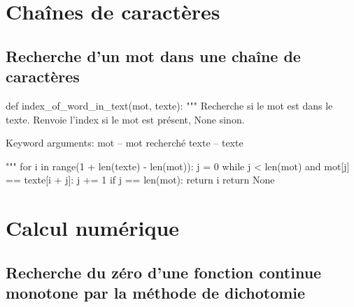\documentclass[10pt]{article}
\begin{document}
\section{Chaînes de caractères}
\subsection{Recherche d'un mot dans une chaîne de caractères}

\begin{minipage}[c]{.48\linewidth}
\begin{pseudo}
\end{pseudo}
\end{minipage} \hfill
\begin{minipage}[c]{.48\linewidth}
\begin{py}
\begin{python}
def index_of_word_in_text(mot, texte):
    """ Recherche si le mot est dans le texte.
    Renvoie l'index si le mot est présent, None sinon.
    
    Keyword arguments:
    mot -- mot recherché
    texte -- texte
    
    """
    for i in range(1 + len(texte) - len(mot)):
        j = 0
        while j < len(mot) and mot[j] == texte[i + j]:
            j += 1
        if j == len(mot):
            return i
    return None
\end{python}
\end{py}
\end{minipage}


\section{Calcul numérique}
\subsection{Recherche du zéro d'une fonction continue monotone par la méthode de dichotomie}
\end{document}
